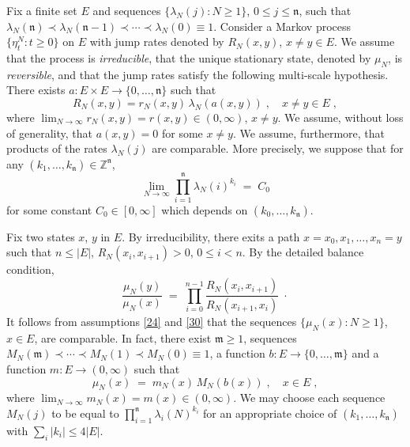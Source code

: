 \documentclass[reqno]{amsart}
\begin{document}
Fix a finite set $E$ and sequences $\{\lambda_N(j):N\ge 1\}$, $0\le
j\le {{\mathfrak n}}$, such that $ \lambda_{N}({{\mathfrak n}}) \prec \lambda_N({{\mathfrak n}} -1)
\prec \cdots \prec \lambda_N(0) \equiv 1$.  Consider a Markov process
$\{\eta^N_t : t\ge 0\}$ on $E$ with jump rates denoted by $R_N(x,y)$,
$x\not = y\in E$. We assume that the process is \emph{irreducible},
that the unique stationary state, denoted by $\mu_N$, is
\emph{reversible}, and that the jump rates satisfy the following
multi-scale hypothesis.  There exists $a: E\times E \to \{0, \dots,
{{\mathfrak n}}\}$ such that
\begin{equation}
\label{24}
R_N(x,y) = r_N(x,y) \, \lambda_N(a(x,y))\;, \quad x\not = y\in E\;,
\end{equation}
where $\lim_{N\to\infty} r_N(x,y) = r(x,y) \in (0,\infty)$, $x\not =
y$. We assume, without loss of generality, that $a(x,y)=0$ for some
$x\not =y$. We assume, furthermore, that products of the rates
$\lambda_N(j)$ are comparable. More precisely, we suppose that for any
$(k_1, \dots, k_{{{\mathfrak n}}}) \in {{\mathbb Z}}^{{{\mathfrak n}}}$,
\begin{equation}
\label{30}
\lim_{N\to \infty} \prod_{i=1}^{{{\mathfrak n}}} \lambda_N(i)^{k_i} \;=\; C_0 
\end{equation}
for some constant $C_0\in [0,\infty]$ which depends on $(k_0, \dots,
k_{{{\mathfrak n}}})$.

Fix two states $x$, $y$ in $E$. By irreducibility, there exits a path
$x=x_0, x_1, \dots, x_n= y$ such that $n \le |E|$, $R_N(x_i,
x_{i+1})>0$, $0\le i<n$. By the detailed balance condition,
\begin{equation}
\label{33}
\frac{\mu_N(y)}{\mu_N(x)} \;=\; \prod_{i=0}^{n-1} 
\frac{R_N(x_i,x_{i+1})}{R_N(x_{i+1},x_i)} \;\cdot
\end{equation}
It follows from assumptions \eqref{24} and \eqref{30} that the
sequences $\{\mu_N(x) : N\ge 1\}$, $x\in E$, are comparable. In fact,
there exist ${{\mathfrak m}}\ge 1$, sequences $M_N({{\mathfrak m}}) \prec \cdots \prec
M_N(1) \prec M_N(0) \equiv 1$, a function $b:E\to \{0, \dots, {{\mathfrak m}}\}$
and a function $m: E \to (0,\infty)$ such that
\begin{equation}
\label{32}
\mu_N(x) \;=\; m_N(x) \, M_N(b(x))\;, \quad x\in E\;,
\end{equation}
where $\lim_{N\to\infty} m_N(x) = m(x) \in (0,\infty)$. We may choose
each sequence $M_N(j)$ to be equal to $\prod_{i=1}^{{{\mathfrak n}}}
\lambda_i(N)^{k_i}$ for an appropriate choice of $(k_1, \dots, k_{{{\mathfrak n}}})$ with $\sum_i |k_i|\le 4 |E|$.
\end{document}

